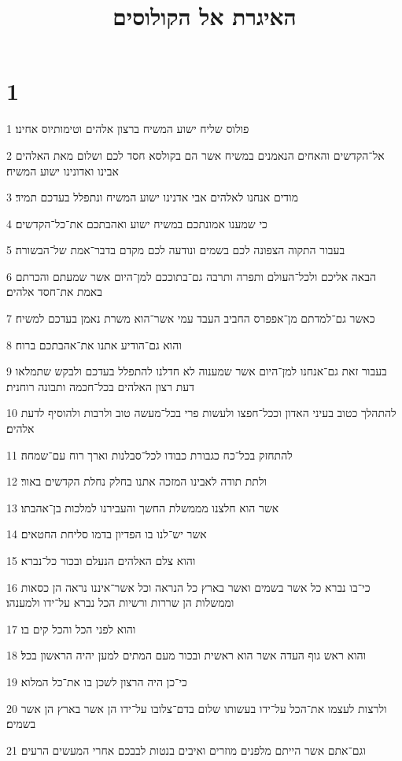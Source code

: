 

\title{האיגרת אל הקולוסים}


\chapter{1}

\par 1 פולוס שליח ישוע המשיח ברצון אלהים וטימותיוס אחינו׃
\par 2 אל־הקדשים והאחים הנאמנים במשיח אשר הם בקולסא חסד לכם ושלום מאת האלהים אבינו ואדונינו ישוע המשיח׃
\par 3 מודים אנחנו לאלהים אבי אדנינו ישוע המשיח ונתפלל בעדכם תמיד׃
\par 4 כי שמענו אמונתכם במשיח ישוע ואהבתכם את־כל־הקדשים׃
\par 5 בעבור התקוה הצפונה לכם בשמים ונודעה לכם מקדם בדבר־אמת של־הבשורה׃
\par 6 הבאה אליכם ולכל־העולם ותפרה ותרבה גם־בתוככם למן־היום אשר שמעתם והכרתם באמת את־חסד אלהים׃
\par 7 כאשר גם־למדתם מן־אפפרס החביב העבד עמי אשר־הוא משרת נאמן בעדכם למשיח׃
\par 8 והוא גם־הודיע אתנו את־אהבתכם ברוח׃
\par 9 בעבור זאת גם־אנחנו למן־היום אשר שמענוה לא חדלנו להתפלל בעדכם ולבקש שתמלאו דעת רצון האלהים בכל־חכמה ותבונה רוחנית׃
\par 10 להתהלך כטוב בעיני האדון וככל־חפצו ולעשות פרי בכל־מעשה טוב ולרבות ולהוסיף לדעת אלהים׃
\par 11 להתחזק בכל־כח כגבורת כבודו לכל־סבלנות וארך רוח עם־שמחה׃
\par 12 ולתת תודה לאבינו המזכה אתנו בחלק נחלת הקדשים באור׃
\par 13 אשר הוא חלצנו מממשלת החשך והעבירנו למלכות בן־אהבתו׃
\par 14 אשר יש־לנו בו הפדיון בדמו סליחת החטאים׃
\par 15 והוא צלם האלהים הנעלם ובכור כל־נברא׃
\par 16 כי־בו נברא כל אשר בשמים ואשר בארץ כל הנראה וכל אשר־איננו נראה הן כסאות וממשלות הן שררות ורשיות הכל נברא על־ידו ולמענהו׃
\par 17 והוא לפני הכל והכל קים בו׃
\par 18 והוא ראש גוף העדה אשר הוא ראשית ובכור מעם המתים למען יהיה הראשון בכל׃
\par 19 כי־כן היה הרצון לשכן בו את־כל המלוא׃
\par 20 ולרצות לעצמו את־הכל על־ידו בעשותו שלום בדם־צלובו על־ידו הן אשר בארץ הן אשר בשמים׃
\par 21 וגם־אתם אשר הייתם מלפנים מוזרים ואיבים בנטות לבבכם אחרי המעשים הרעים׃
